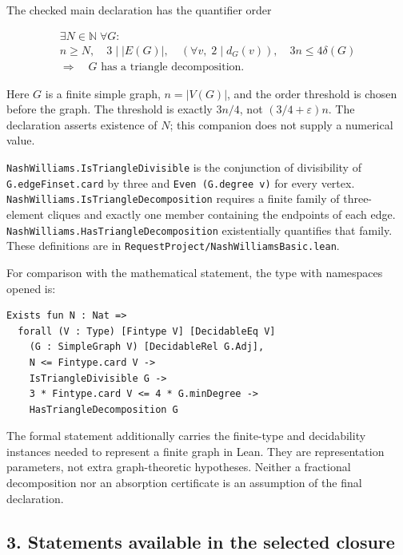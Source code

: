 \documentclass[english,11pt,a4paper]{article}
\begin{document}
The checked main declaration has the quantifier order

\[\begin{gathered}
\exists N\in\mathbb N\;\forall G:\\
n\ge N,\quad 3\mid |E(G)|,\quad
(\forall v,\;2\mid d_G(v)),\quad 3n\le4\delta(G)
\\
\Longrightarrow\quad G\text{ has a triangle decomposition}.
\end{gathered}\]

Here \(G\) is a finite simple graph, \(n=|V(G)|\), and the order threshold is chosen before the graph. The threshold is exactly \(3n/4\), not \((3/4+\varepsilon)n\). The declaration asserts existence of \(N\); this companion does not supply a numerical value.

\texttt{Nash\allowbreak{}Williams.\allowbreak{}Is\allowbreak{}Triangle\allowbreak{}Divisible} is the conjunction of divisibility of \texttt{G.\allowbreak{}edge\allowbreak{}Finset.\allowbreak{}card} by three and \texttt{Even\ (G.\allowbreak{}degree\ v)} for every vertex. \texttt{Nash\allowbreak{}Williams.\allowbreak{}Is\allowbreak{}Triangle\allowbreak{}Decomposition} requires a finite family of three-element cliques and exactly one member containing the endpoints of each edge. \texttt{Nash\allowbreak{}Williams.\allowbreak{}Has\allowbreak{}Triangle\allowbreak{}Decomposition} existentially quantifies that family. These definitions are in \texttt{Request\allowbreak{}Project/\allowbreak{}Nash\allowbreak{}Williams\allowbreak{}Basic.\allowbreak{}lean}.

For comparison with the mathematical statement, the type with namespaces opened is:

\begin{verbatim}
Exists fun N : Nat =>
  forall (V : Type) [Fintype V] [DecidableEq V]
    (G : SimpleGraph V) [DecidableRel G.Adj],
    N <= Fintype.card V ->
    IsTriangleDivisible G ->
    3 * Fintype.card V <= 4 * G.minDegree ->
    HasTriangleDecomposition G
\end{verbatim}

The formal statement additionally carries the finite-type and decidability instances needed to represent a finite graph in Lean. They are representation parameters, not extra graph-theoretic hypotheses. Neither a fractional decomposition nor an absorption certificate is an assumption of the final declaration.


\subsection{3. Statements available in the selected closure}\label{statements-available-in-the-selected-closure}
\end{document}
